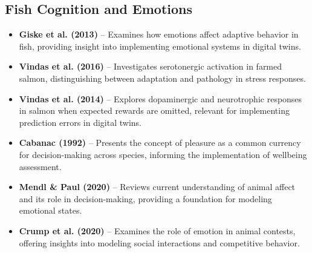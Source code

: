 \documentclass[11pt,a4paper]{article}
\begin{document}
\subsection*{Fish Cognition and Emotions}
\begin{itemize}
    \item \textbf{Giske et al. (2013)} \cite{giske2013effects} -- Examines how emotions affect adaptive behavior in fish, providing insight into implementing emotional systems in digital twins.
    
    \item \textbf{Vindas et al. (2016)} \cite{vindas2016brain} -- Investigates serotonergic activation in farmed salmon, distinguishing between adaptation and pathology in stress responses.
    
    \item \textbf{Vindas et al. (2014)} \cite{vindas2014coping} -- Explores dopaminergic and neurotrophic responses in salmon when expected rewards are omitted, relevant for implementing prediction errors in digital twins.
    
    \item \textbf{Cabanac (1992)} \cite{cabanac1992pleasure} -- Presents the concept of pleasure as a common currency for decision-making across species, informing the implementation of wellbeing assessment.
    
    \item \textbf{Mendl \& Paul (2020)} \cite{mendl2020animal} -- Reviews current understanding of animal affect and its role in decision-making, providing a foundation for modeling emotional states.
    
    \item \textbf{Crump et al. (2020)} \cite{crump2020emotion} -- Examines the role of emotion in animal contests, offering insights into modeling social interactions and competitive behavior.
\end{itemize}
\end{document}
